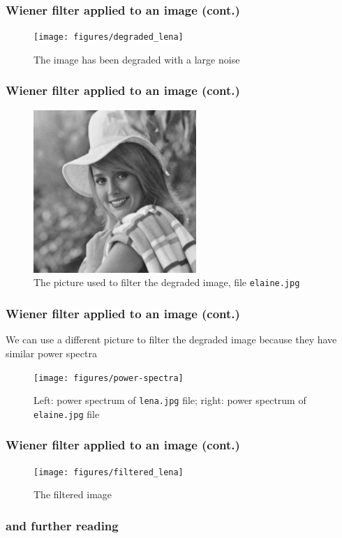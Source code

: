 \documentclass[10pt]{beamer}
\begin{document}
\begin{frame}
  \frametitle{Wiener filter applied to an image (cont.)}
  \begin{figure}
    \centering
    \texttt{[image: figures/degraded\_lena]}
    \caption{The image has been degraded with a large noise}
  \end{figure}
\end{frame}

\begin{frame}
  \frametitle{Wiener filter applied to an image (cont.)}
  \begin{figure}
    \centering
    \includegraphics[width=0.55\textwidth]{elaine}
    \caption{The picture used to filter the degraded image, file
      \texttt{elaine.jpg}}
  \end{figure}
\end{frame}

\begin{frame}
  \frametitle{Wiener filter applied to an image (cont.)}
  We can use a different picture to filter the degraded image because they have
  similar power spectra
  \begin{figure}
    \centering
    \texttt{[image: figures/power-spectra]}
    \caption{Left: power spectrum of \texttt{lena.jpg} file; right: power
      spectrum of \texttt{elaine.jpg} file}
  \end{figure}
\end{frame}

\begin{frame}
  \frametitle{Wiener filter applied to an image (cont.)}
  \begin{figure}
    \centering
    \texttt{[image: figures/filtered\_lena]}
    \caption{The filtered image}
  \end{figure}
\end{frame}

\begin{frame}
  \frametitle{\refname{} and further reading}
  \nocite{*}
  \printbibliography{}
\end{frame}
\end{document}
